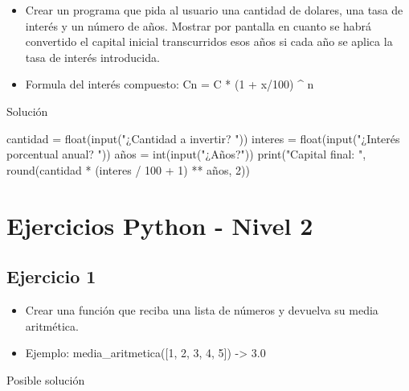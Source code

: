 \documentclass[
  a4paper,
  DIV=11,
  numbers=noendperiod,
  onepage,
  openany]{scrreprt}
\newenvironment{Shaded}{\begin{snugshade}}{\end{snugshade}}
\newcommand{\BuiltInTok}[1]{\textcolor[rgb]{0.00,0.23,0.31}{#1}}
\newcommand{\DecValTok}[1]{\textcolor[rgb]{0.68,0.00,0.00}{#1}}
\newcommand{\NormalTok}[1]{\textcolor[rgb]{0.00,0.23,0.31}{#1}}
\newcommand{\OperatorTok}[1]{\textcolor[rgb]{0.37,0.37,0.37}{#1}}
\newcommand{\StringTok}[1]{\textcolor[rgb]{0.13,0.47,0.30}{#1}}
\providecommand{\tightlist}{%
  \setlength{\itemsep}{0pt}\setlength{\parskip}{0pt}}\usepackage{longtable,booktabs,array}
\begin{document}
\begin{itemize}
\tightlist
\item
  Crear un programa que pida al usuario una cantidad de dolares, una
  tasa de interés y un número de años. Mostrar por pantalla en cuanto se
  habrá convertido el capital inicial transcurridos esos años si cada
  año se aplica la tasa de interés introducida.
\item
  Formula del interés compuesto: Cn = C * (1 + x/100) \^{} n
\end{itemize}

Solución

\begin{Shaded}
\begin{Highlighting}[]
\NormalTok{cantidad }\OperatorTok{=} \BuiltInTok{float}\NormalTok{(}\BuiltInTok{input}\NormalTok{(}\StringTok{"¿Cantidad a invertir? "}\NormalTok{))}
\NormalTok{interes }\OperatorTok{=} \BuiltInTok{float}\NormalTok{(}\BuiltInTok{input}\NormalTok{(}\StringTok{"¿Interés porcentual anual? "}\NormalTok{))}
\NormalTok{años }\OperatorTok{=} \BuiltInTok{int}\NormalTok{(}\BuiltInTok{input}\NormalTok{(}\StringTok{"¿Años?"}\NormalTok{))}
\BuiltInTok{print}\NormalTok{(}\StringTok{"Capital final: "}\NormalTok{, }\BuiltInTok{round}\NormalTok{(cantidad }\OperatorTok{*}\NormalTok{ (interes }\OperatorTok{/} \DecValTok{100} \OperatorTok{+} \DecValTok{1}\NormalTok{) }\OperatorTok{**}\NormalTok{ años, }\DecValTok{2}\NormalTok{))}
\end{Highlighting}
\end{Shaded}

\chapter{Ejercicios Python - Nivel 2}\label{ejercicios-python---nivel-2}

\section{Ejercicio 1}\label{ejercicio-1-3}

\begin{itemize}
\tightlist
\item
  Crear una función que reciba una lista de números y devuelva su media
  aritmética.
\item
  Ejemplo: media\_aritmetica({[}1, 2, 3, 4, 5{]}) -\textgreater{} 3.0
\end{itemize}

Posible solución
\end{document}
